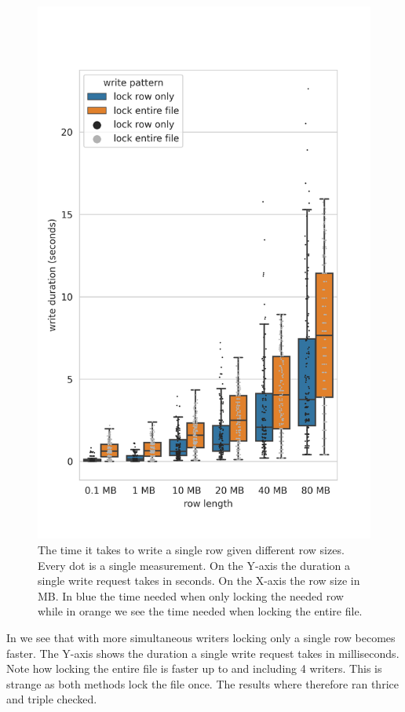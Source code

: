 \begin{figure}[htbp]
	\includegraphics[width=3\textwidth]{../results/plots/single_vs_row_len.png}
	\caption{The time it takes to write a single row given different row sizes. Every dot is a single measurement. On the Y-axis the duration a single write request takes in seconds. On the X-axis the row size in MB. In blue the time needed when only locking the needed row while in orange we see the time needed when locking the entire file.}
	\label{fig:single_rowlen}
\end{figure}
%
In  we see that with more simultaneous writers locking only a single row becomes faster. The Y-axis shows the duration a single write request takes in milliseconds. Note how locking the entire file is faster up to and including 4 writers. This is strange as both methods lock the file once. The results where therefore ran thrice and triple checked.
